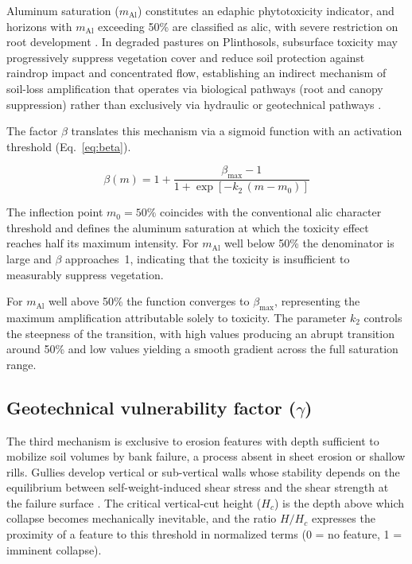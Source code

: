 \documentclass[preprint,review,12pt,authoryear]{elsarticle}
\begin{document}
Aluminum saturation ($m_{\mathrm{Al}}$) constitutes an edaphic phytotoxicity indicator, and horizons with $m_{\mathrm{Al}}$ exceeding 50\% are classified as alic, with severe restriction on root development \citep{embrapa_2018}. In degraded pastures on Plinthosols, subsurface toxicity may progressively suppress vegetation cover and reduce soil protection against raindrop impact and concentrated flow, establishing an indirect mechanism of soil-loss amplification that operates via biological pathways (root and canopy suppression) rather than exclusively via hydraulic or geotechnical pathways \citep{kochian_et_al_2005,gyssels_et_al_2005}.

The factor $\beta$ translates this mechanism via a sigmoid function with an activation threshold (Eq.~\ref{eq:beta}).

\begin{equation}
\beta(m) = 1 + \frac{\beta_{\max} - 1}{1 + \exp\!\left[-k_2\,(m - m_0)\right]}
\label{eq:beta}
\end{equation}

The inflection point $m_0 = 50\%$ coincides with the conventional alic character threshold and defines the aluminum saturation at which the toxicity effect reaches half its maximum intensity. For $m_{\mathrm{Al}}$ well below 50\% the denominator is large and $\beta$ approaches~1, indicating that the toxicity is insufficient to measurably suppress vegetation.

For $m_{\mathrm{Al}}$ well above 50\% the function converges to $\beta_{\max}$, representing the maximum amplification attributable solely to toxicity. The parameter $k_2$ controls the steepness of the transition, with high values producing an abrupt transition around 50\% and low values yielding a smooth gradient across the full saturation range.

\subsection{Geotechnical vulnerability factor ($\gamma$)}

The third mechanism is exclusive to erosion features with depth sufficient to mobilize soil volumes by bank failure, a process absent in sheet erosion or shallow rills. Gullies develop vertical or sub-vertical walls whose stability depends on the equilibrium between self-weight-induced shear stress and the shear strength at the failure surface \citep{fredlund_rahardjo_1993}. The critical vertical-cut height ($H_c$) is the depth above which collapse becomes mechanically inevitable, and the ratio $H/H_c$ expresses the proximity of a feature to this threshold in normalized terms (0 = no feature, 1 = imminent collapse).
\end{document}
